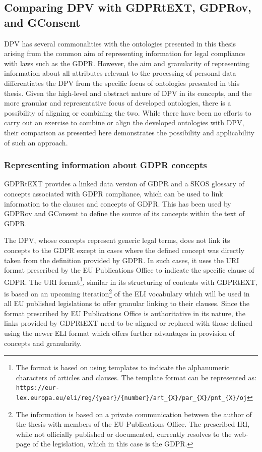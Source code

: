 \subsection{Comparing DPV with GDPRtEXT, GDPRov, and GConsent}
DPV has several commonalities with the ontologies presented in this thesis arising from the common aim of representing information for legal compliance with laws such as the GDPR.
However, the aim and granularity of representing information about all attributes relevant to the processing of personal data differentiates the DPV from the specific focus of ontologies presented in this thesis.
Given the high-level and abstract nature of DPV in its concepts, and the more granular and representative focus of developed ontologies, there is a possibility of aligning or combining the two.
While there have been no efforts to carry out an exercise to combine or align the developed ontologies with DPV, their comparison as presented here demonstrates the possibility and applicability of such an approach.

\subsubsection{Representing information about GDPR concepts}
GDPRtEXT provides a linked data version of GDPR and a SKOS glossary of concepts associated with GDPR compliance, which can be used to link information to the clauses and concepts of GDPR.
This has been used by GDPRov and GConsent to define the source of its concepts within the text of GDPR.

The DPV, whose concepts represent generic legal terms, does not link its concepts to the GDPR except in cases where the defined concept was directly taken from the definition provided by GDPR.
In such cases, it uses the URI format prescribed by the EU Publications Office to indicate the specific clause of GDPR. The URI format\footnote{The format is based on using templates to indicate the alphanumeric characters of articles and clauses. The template format can be represented as: \texttt{https://eur-lex.europa.eu/eli/reg/\{year\}/\{number\}/art\_\{X\}/par\_\{X\}/pnt\_\{X\}/oj}}, similar in its structuring of contents with GDPRtEXT, is based on an upcoming iteration\footnote{The information is based on a private communication between the author of the thesis with members of the EU Publications Office. The prescribed IRI, while not officially published or documented, currently resolves to the web-page of the legislation, which in this case is the GDPR.} of the ELI vocabulary which will be used in all EU published legislations to offer granular linking to their clauses.
Since the format prescribed by EU Publications Office is authoritative in its nature, the links provided by GDPRtEXT need to be aligned or replaced with those defined using the newer ELI format which offers further advantages in provision of concepts and granularity.


